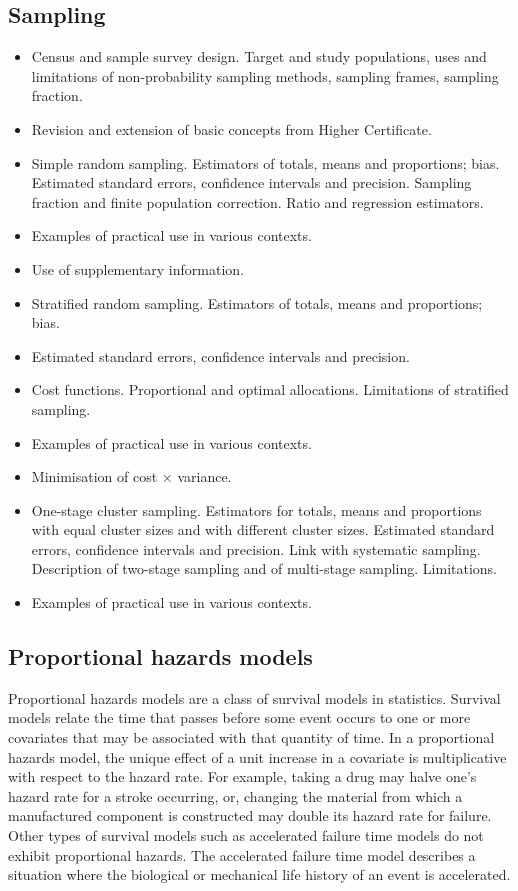 \subsection*{Sampling}
\begin{itemize}
\item	Census and sample survey design. Target and study populations, uses and limitations of non-probability sampling methods, sampling frames, sampling fraction.
\item	Revision and extension of basic concepts from Higher Certificate.
\item	Simple random sampling. Estimators of totals, means and proportions; bias. Estimated standard errors, confidence intervals and precision. Sampling fraction and finite population correction. Ratio and regression estimators.
\item	Examples of practical use in various contexts.
\item	Use of supplementary information.
\item	Stratified random sampling. Estimators of totals, means and proportions; bias. 
\item Estimated standard errors, confidence intervals and precision. 
\item Cost functions. Proportional and optimal allocations. Limitations of stratified sampling.
\item	Examples of practical use in various contexts.
\item	Minimisation of cost × variance.
\item	One-stage cluster sampling. Estimators for totals, means and proportions with equal cluster sizes and with different cluster sizes. Estimated standard errors, confidence intervals and precision. Link with systematic sampling. Description of two-stage sampling and of multi-stage sampling. Limitations.
\item	Examples of practical use in various contexts.
\end{itemize}
\newpage
\subsection*{Proportional hazards models}
Proportional hazards models are a class of survival models in statistics. Survival models relate the time that passes before some event occurs to one or more covariates that may be associated with that quantity of time. In a proportional hazards model, the unique effect of a unit increase in a covariate is multiplicative with respect to the hazard rate. For example, taking a drug may halve one's hazard rate for a stroke occurring, or, changing the material from which a manufactured component is constructed may double its hazard rate for failure. Other types of survival models such as accelerated failure time models do not exhibit proportional hazards. The accelerated failure time model describes a situation where the biological or mechanical life history of an event is accelerated.

